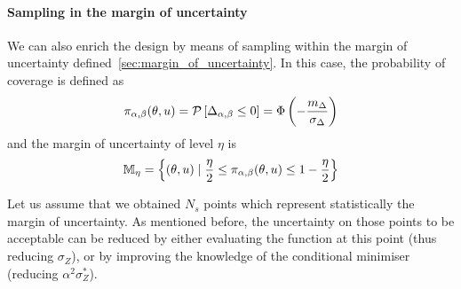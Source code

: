 \documentclass[../../Main_ManuscritThese.tex]{subfiles}
\begin{document}
\paragraph{Sampling in the margin of uncertainty}
We can also enrich the design by means of sampling within the margin of uncertainty defined~\cref{sec:margin_of_uncertainty}. In this case, the probability of coverage is defined as
\begin{equation}
  \pi_{\alpha,\beta}(\theta, u) = \mathcal{P}\left[\Delta_{\alpha,\beta} \leq 0\right] = \Phi\left(-\frac{m_{\Delta}}{\sigma_{\Delta}}\right)
\end{equation}
and the margin of uncertainty of level $\eta$ is
\begin{equation}
  \mathbb{M}_{\eta} = \left\{ (\theta, u) \mid \frac{\eta}{2} \leq \pi_{\alpha,\beta}(\theta, u) \leq 1 - \frac{\eta}{2}\right\}
\end{equation}

Let us assume that we obtained $N_s$ points which represent statistically the margin of uncertainty. As mentioned before, the uncertainty on those points to be acceptable can be reduced by either evaluating the function at this point (thus reducing $\sigma_Z$), or by improving the knowledge of the conditional minimiser (reducing $\alpha^2 \sigma_Z^*$). 



\end{document}
